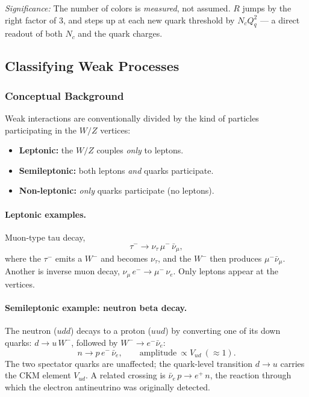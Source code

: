 \textit{Significance:} The number of colors is \emph{measured}, not
assumed. $R$ jumps by the right factor of $3$, and steps up at each new
quark threshold by $N_c Q_q^2$ --- a direct readout of both $N_c$ and
the quark charges.


\subsection{Classifying Weak Processes}\label{subsec:lec21:taxonomy}

\subsubsection*{Conceptual Background}

Weak interactions are conventionally divided by the kind of particles
participating in the $W/Z$ vertices:
\begin{itemize}
  \item \textbf{Leptonic:} the $W/Z$ couples \emph{only} to leptons.
  \item \textbf{Semileptonic:} both leptons \emph{and} quarks
        participate.
  \item \textbf{Non-leptonic:} \emph{only} quarks participate (no
        leptons).
\end{itemize}

\paragraph{Leptonic examples.}
Muon-type tau decay,
\begin{equation}
  \tau^- \to \nu_\tau\,\mu^-\,\bar\nu_\mu ,
  \label{eq:lec21:taudecay}
\end{equation}
where the $\tau^-$ emits a $W^-$ and becomes $\nu_\tau$, and the $W^-$
then produces $\mu^-\bar\nu_\mu$. Another is inverse muon decay,
$\nu_\mu\,e^- \to \mu^-\,\nu_e$. Only leptons appear at the vertices.

\paragraph{Semileptonic example: neutron beta decay.}
The neutron ($udd$) decays to a proton ($uud$) by converting one of its
down quarks: $d\to u\,W^-$, followed by $W^-\to e^-\bar\nu_e$:
\begin{equation}
  n\to p\,e^-\,\bar\nu_e ,
  \qquad \text{amplitude}\ \propto V_{ud}\ (\approx 1).
  \label{eq:lec21:betadecay}
\end{equation}
The two spectator quarks are unaffected; the quark-level transition
$d\to u$ carries the CKM element $V_{ud}$. A related crossing is
$\bar\nu_e\,p\to e^+\,n$, the reaction through which the electron
antineutrino was originally detected.

